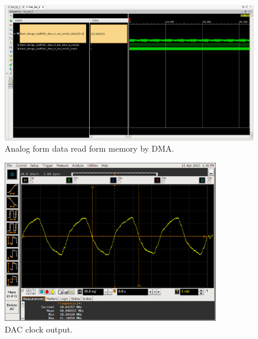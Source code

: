 \begin{figure}[htbp]
    \centering
    \includegraphics[width=1\textwidth,
    trim={{.11\textwidth} {.95\textwidth} {.04\textwidth} {.15\textwidth}},
    clip]{./figures/ltedac_ila}
    \caption{ Analog form data read form memory by DMA.
    \label{fig:dataflowana}}
\end{figure}

\begin{figure}[htbp]
    \centering
    \includegraphics[width=0.85\textwidth,
    trim={{.17\textwidth} 0 {.02\textwidth} {.24\textwidth}},
    clip]{./figures/oscill_ad9361_dac_clk}
    \caption{ DAC clock output.
    \label{fig:dacclk}}
\end{figure}


